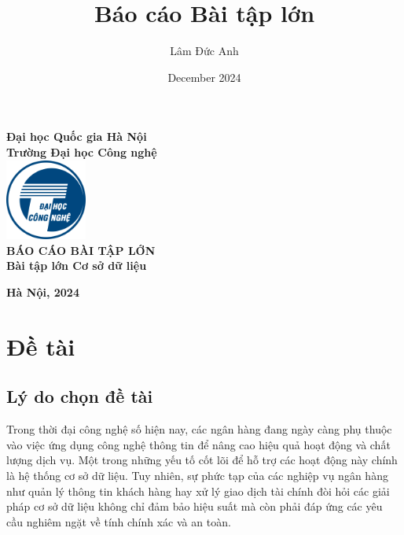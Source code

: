 \documentclass[a4paper, 12pt]{report}
\title{Báo cáo Bài tập lớn}
\author{Lâm Đức Anh}
\date{December 2024}
\begin{document}
\begin{titlepage}

    \begin{center}

        \textbf{\large Đại học Quốc gia Hà Nội}\\[0.2cm]
        \textbf{\large Trường Đại học Công nghệ}\\[1cm]

        \includegraphics[width=0.2\textwidth]{UET.png}\\[2.5cm]

        \textbf{\Huge BÁO CÁO BÀI TẬP LỚN}\\[0.5cm]
        \textbf{\Large Bài tập lớn Cơ sở dữ liệu}\\[2.5cm]
        
        
    \end{center}
    \vfill
    \begin{center}
        \textbf{\large Hà Nội, 2024}
    \end{center}
    
\end{titlepage}

\tableofcontents %

\newpage %


\chapter{Đề tài}

\section{Lý do chọn đề tài}

\setlength{\parindent}{2em}

Trong thời đại công nghệ số hiện nay, các ngân hàng đang ngày càng phụ thuộc vào việc ứng dụng công nghệ thông tin để nâng cao hiệu quả hoạt động và chất lượng dịch vụ. 
Một trong những yếu tố cốt lõi để hỗ trợ các hoạt động này chính là hệ thống cơ sở dữ liệu. 
Tuy nhiên, sự phức tạp của các nghiệp vụ ngân hàng như quản lý thông tin khách hàng hay xử lý giao dịch tài chính đòi hỏi các giải pháp cơ sở dữ liệu không chỉ đảm bảo hiệu suất mà còn phải đáp ứng các yêu cầu nghiêm ngặt về tính chính xác và an toàn.
\end{document}
